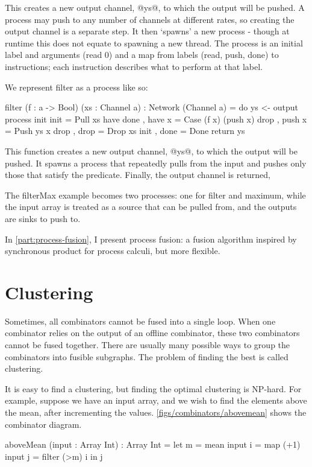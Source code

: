 This creates a new output channel, @ys@, to which the output will be pushed.
A process may push to any number of channels at different rates, so creating the output channel is a separate step.
It then `spawns' a new process - though at runtime this does not equate to spawning a new thread.
The process is an initial label and arguments (read 0) and a map from labels (read, push, done) to instructions; each instruction describes what to perform at that label.



We represent filter as a process like so:
\begin{code}
filter (f : a -> Bool) (xs : Channel a) : Network (Channel a)
 = do ys <- output
      process init
       { init   = Pull xs have done
       , have x = Case (f x) (push x) drop
       , push x = Push ys x drop
       , drop   = Drop xs init
       , done   = Done
       }
      return ys
\end{code}

This function creates a new output channel, @ys@, to which the output will be pushed. 
It spawns a process that repeatedly pulls from the input and pushes only those that satisfy the predicate.
Finally, the output channel is returned,


The filterMax example becomes two processes: one for filter and maximum, while the input array is treated as a source that can be pulled from, and the outputs are sinks to push to.

In \autoref{part:process-fusion}, I present process fusion: a fusion algorithm inspired by synchronous product for process calculi, but more flexible.

\section{Clustering}
Sometimes, all combinators cannot be fused into a single loop.
When one combinator relies on the output of an offline combinator, these two combinators cannot be fused together.
There are usually many possible ways to group the combinators into fusible subgraphs.
The problem of finding the best is called clustering.

It is easy to find a clustering, but finding the optimal clustering is NP-hard.
For example, suppose we have an input array, and we wish to find the elements above the mean, after incrementing the values.
\autoref{figs/combinators/abovemean} shows the combinator diagram.

\begin{code}
aboveMean (input : Array Int) : Array Int
 = let m = mean         input
       i = map (+1)     input
       j = filter (>m)  i
   in  j
\end{code}

